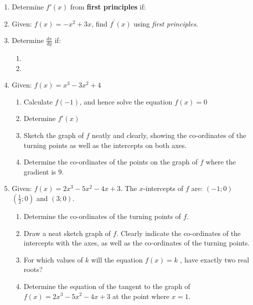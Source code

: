 \begin{eocexercises}{}
\begin{enumerate}

\item{Determine $f'(x)$ from \textbf{first principles} if:
\begin{enumerate}
\end{enumerate}}

\item{Given: \quad $f(x) = -x^2 + 3x$, find $f^{\prime}(x)$ using \textit{first principles}.}

\item{Determine $\frac{dx}{dy}$ if:
\begin{enumerate}
\item{}
\item{}
\end{enumerate}}

\item{Given: $f(x) =x^3 - 3x^2 + 4$
\begin{enumerate}
\item{Calculate $f(-1)$, and hence solve the equation $f(x)=0$}
\item{Determine $f'(x)$}
\item{Sketch the graph of $f$ neatly and clearly, showing the co-ordinates of the turning points as well as the intercepts on both axes.}
\item{Determine the co-ordinates of the points on the graph of $f$  where the gradient is $9$.}
\end{enumerate}}

\item{Given: $f(x) = 2x^3 - 5x^2 - 4x + 3$.
The $x$-intercepts of $f$ are: $(-1;0)$ $(\frac{1}{2};0)$ and $(3;0)$.
\begin{enumerate}
\item{Determine the co-ordinates of the turning points of $f$.}
\item{Draw a neat sketch graph of $f$. Clearly indicate the co-ordinates of the intercepts with the axes, as well as the co-ordinates of the turning points.}
\item{For which values of $k$ will the equation $f(x) = k$ , have exactly two real roots?}
\item{Determine the equation of the tangent to the graph of
$f(x) = 2x^3 - 5x^2 - 4x + 3$ at the point where $x = 1$.}
\end{enumerate}}


\end{enumerate}
\end{eocexercises}
